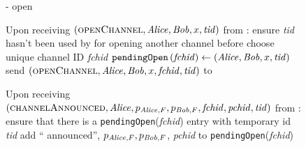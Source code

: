   \begin{figure}[H]
    \begin{systembox}{\fpaynet - open}
      \begin{algorithmic}[1]
        \State Upon receiving $\left(\textsc{openChannel}, \mathit{Alice}, \mathit{Bob}, x,
        \mathit{tid}\right)$ from \alice:
        \Indent
          \State ensure \textit{tid} hasn't been used by \alice{} for opening
          another channel before
          \label{alg:fpaynet:open:valid}
          \State choose unique channel ID \textit{fchid}
          \State $\mathtt{pendingOpen}\left(\mathit{fchid}\right) \gets
          \left(\mathit{Alice}, \mathit{Bob}, x, \mathit{tid}\right)$
          \State send $\left(\textsc{openChannel}, \mathit{Alice}, \mathit{Bob}, x,
          \mathit{fchid}, \mathit{tid}\right)$ to \simulator
        \EndIndent
        \Statex

        \State Upon receiving $\left(\textsc{channelAnnounced}, \mathit{Alice},
        p_{\mathit{Alice}, F}, p_{\mathit{Bob}, F}, \mathit{fchid}, \mathit{pchid},
        \mathit{tid}\right)$ from \simulator:
        \Indent
          \State ensure that there is a \texttt{pendingOpen}(\textit{fchid})
          entry with temporary id \textit{tid}
          \label{alg:fpaynet:announced:valid}
          \State add ``\alice{} announced'', $p_{\mathit{Alice}, F}, p_{\mathit{Bob}, F}$,
          \textit{pchid} to \texttt{pendingOpen}(\textit{fchid})
          \label{alg:fpaynet:announced:add}
        \EndIndent
        \Statex


\end{algorithmic}
\end{systembox}
\end{figure}
